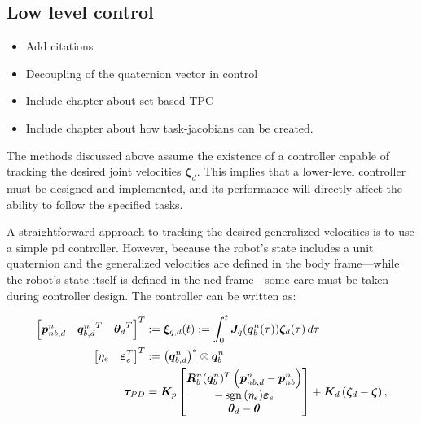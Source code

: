 \subsection{Low level control}

{
\color{red}
\begin{itemize}
    \item Add citations
    \item Decoupling of the quaternion vector in control
    \item Include chapter about set-based TPC
    \item Include chapter about how task-jacobians can be created.
\end{itemize}
}

The methods discussed above assume the existence of a controller capable of tracking the desired joint velocities \(\bm{\zeta}_d\). This implies that a lower-level controller must be designed and implemented, and its performance will directly affect the ability to follow the specified tasks.

A straightforward approach to tracking the desired generalized velocities is to use a simple \gls{pd} controller. However, because the robot’s state includes a unit quaternion and the generalized velocities are defined in the body frame—while the robot's state itself is defined in the \gls{ned} frame—some care must be taken during controller design. The controller can be written as:

\begin{subequations}
\label{eq:tau_pd}
\begin{align}
    \begin{bmatrix}
        \bm{p}_{nb,d}^n & {\bm{q}_{b,d}^n}^T & {\bm{\theta}_d}^T
    \end{bmatrix}^T
    &:=
    \bm{\xi}_{q,d}(t) := \int_{0}^{t} \bm{J}_q(\bm{q}_b^n(\tau))\bm{\zeta}_d(\tau)\,d\tau
    \\
    \begin{bmatrix} \eta_e & \bm{\varepsilon}_e^T\end{bmatrix}^T &:= \left(\bm{q}_{b,d}^n\right)^* \otimes \bm{q}_b^n
    \\
    \bm{\tau}_{PD} &= 
    \bm{K}_p \begin{bmatrix}
        \bm{R}_b^n(\bm{q}_b^n)^T\left(\bm{p}_{nb,d}^n - \bm{p}_{nb}^n\right) \\
        -\operatorname{sgn}{(\eta_e)} \bm{\varepsilon}_e \\
        \bm{\theta}_d - \bm{\theta}
    \end{bmatrix} + 
    \bm{K}_d  \left(\bm{\zeta}_d - \bm{\zeta} \right), 
\end{align}
\end{subequations}

